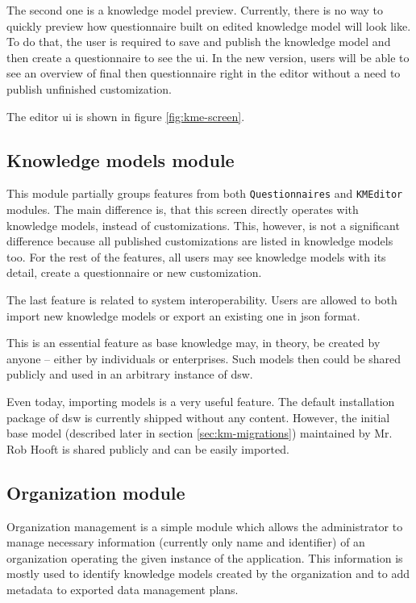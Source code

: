 The second one is a knowledge model preview.
Currently, there is no way to quickly preview how questionnaire built on edited knowledge model will look like.
To do that, the user is required to save and publish the knowledge model and then create a questionnaire to see the \gls{ui}.
In the new version, users will be able to see an overview of final then questionnaire right in the editor without a need to publish unfinished customization.

The editor \gls{ui} is shown in figure \ref{fig:kme-screen}.


\subsection{Knowledge models module}

This module partially groups features from both \texttt{Questionnaires} and \texttt{KMEditor} modules.
The main difference is, that this screen directly operates with knowledge models, instead of customizations.
This, however, is not a significant difference because all published customizations are listed in knowledge models too.
For the rest of the features, all users may see knowledge models with its detail, create a questionnaire or new customization.

The last feature is related to system interoperability.
Users are allowed to both import new knowledge models or export an existing one in \gls{json} format.

This is an essential feature as base knowledge may, in theory, be created by anyone -- either by individuals or enterprises.
Such models then could be shared publicly and used in an arbitrary instance of \gls{dsw}.

Even today, importing models is a very useful feature.
The default installation package of \gls{dsw} is currently shipped without any content.
However, the initial base model (described later in section \ref{sec:km-migrations}) maintained by Mr. Rob Hooft is shared publicly and can be easily imported.

\subsection{Organization module}

Organization management is a simple module which allows the administrator to manage necessary information (currently only name and identifier) of an organization operating the given instance of the application.
This information is mostly used to identify knowledge models created by the organization and to add metadata to exported data management plans.

